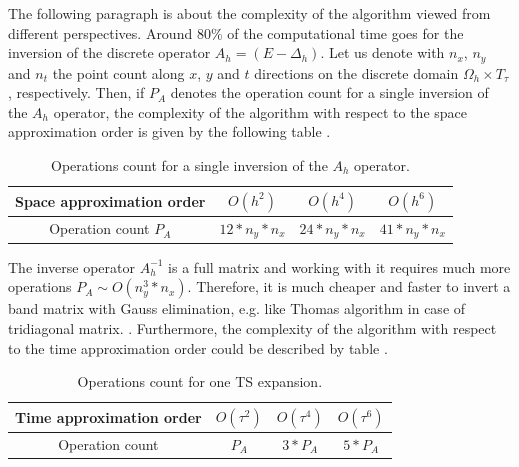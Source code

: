 \documentclass[11pt,a4paper,twoside]{article}
\begin{document}
The following paragraph is about the complexity of the algorithm viewed from different perspectives. Around 80\% of the computational time goes for the inversion of the discrete operator $A_h = (E - \Delta_h)$. Let us denote with $n_x$, $n_y$ and $n_t$ the point count along $x$, $y$ and $t$ directions on the discrete domain $\Omega_h \times T_{\tau}$, respectively. Then, if $P_A$ denotes the operation count for a single inversion of the $A_h$ operator, the complexity of the algorithm with respect to the space approximation order is given by the following table . \begin{table}[!htbp]
\centering
		\begin{tabular}{|c|c|c|c|}
			\hline
      Space approximation order  &        $O(h^2)$    &        $O(h^4)$     &        $O(h^6)$    \\
			\hline 
      Operation count $P_A$ &        $12 * n_y * n_x$    &        $24 * n_y * n_x$     &        $41 * n_y * n_x$    \\
			\hline
		\end{tabular}
		\caption{Operations count for a single inversion of the $A_h$ operator.}

\label{tab:b}
\end{table}

The inverse operator $A_h^{-1}$ is a full matrix and working with it requires much more operations $P_A \sim O(n_y^3 * n_x)$. Therefore, it is much cheaper and faster to invert a band matrix with Gauss elimination, e.g. like Thomas algorithm in case of tridiagonal matrix.
. Furthermore, the complexity of the algorithm with respect to the time approximation order could be described by table .
\begin{table}[!htbp]
\centering
		\begin{tabular}{|c|c|c|c|}
			\hline
       Time approximation order  &        $O(\tau^2)$    &        $O(\tau^4)$     &        $O(\tau^6)$    \\
			\hline 
      Operation count  &        $P_A$    &        $3 * P_A$     &        $5 * P_A$    \\
			\hline
		\end{tabular}
		\caption{Operations count for one TS expansion.}

\label{tab:c}
\end{table}
\end{document}
